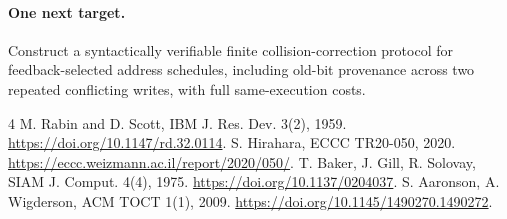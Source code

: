 \documentclass[11pt]{article}
\begin{document}
\paragraph{One next target.} Construct a syntactically verifiable finite collision-correction protocol for feedback-selected address schedules, including old-bit provenance across two repeated conflicting writes, with full same-execution costs.
\begin{thebibliography}{4}
 M. Rabin and D. Scott, IBM J. Res. Dev. 3(2), 1959. \url{https://doi.org/10.1147/rd.32.0114}.
 S. Hirahara, ECCC TR20-050, 2020. \url{https://eccc.weizmann.ac.il/report/2020/050/}.
 T. Baker, J. Gill, R. Solovay, SIAM J. Comput. 4(4), 1975. \url{https://doi.org/10.1137/0204037}.
 S. Aaronson, A. Wigderson, ACM TOCT 1(1), 2009. \url{https://doi.org/10.1145/1490270.1490272}.
\end{thebibliography}
\end{document}
